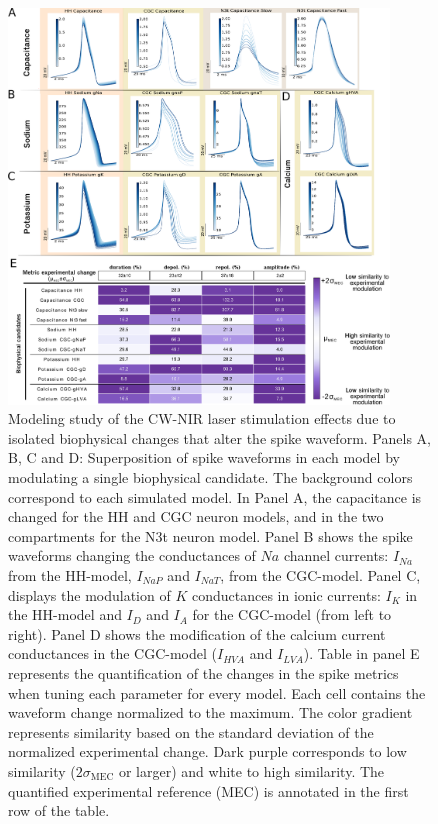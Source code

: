 \begin{figure}[hbt!]
	\centering
	\includegraphics[width=0.9\textwidth]{img/laser/Figure4.pdf}
	
	\caption{Modeling study of the CW-NIR laser stimulation effects due to isolated biophysical changes that alter the spike waveform. Panels A, B, C and D: Superposition of spike waveforms in each model by modulating a single biophysical candidate. The background colors correspond to each simulated model. In Panel A, the capacitance is changed for the HH and CGC neuron models, and in the two compartments for the N3t neuron model. Panel B shows the spike waveforms changing the conductances of $Na$ channel currents: $I_{Na}$ from the HH-model, $I_{NaP}$ and $I_{NaT}$, from the CGC-model. Panel C, displays the modulation of $K$ conductances in ionic currents: $I_{K}$ in the HH-model and $I_{D}$ and $I_{A}$ for the CGC-model (from left to right). Panel D shows the modification of the calcium current conductances in the CGC-model ($I_{HVA}$ and $I_{LVA}$). Table in panel E represents the quantification of the changes in the spike metrics when tuning each parameter for every model. Each cell contains the waveform change normalized to the maximum. The color gradient represents similarity based on the standard deviation of the normalized experimental change. Dark purple corresponds to low similarity ($2\sigma_{\textrm{MEC}}$ or larger) and white to high similarity. The quantified experimental reference (MEC) is annotated in the first row of the table.}
	\label{fig:continuous_model}
\end{figure}

